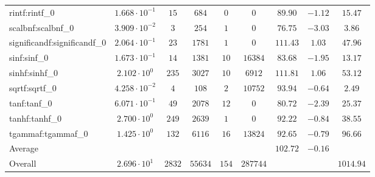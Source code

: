 \begin{tabular}{|l|c|c|c|c|c|c|c|c|}
rintf:rintf\_0               & $ 1.668 \cdot 10^{-1} $ & $ 15     $ & $ 684   $ & $ 0   $ & $ 0      $ & $ 89.90       $ & $ -1.12   $ & $ 15.47   $ \\
scalbnf:scalbnf\_0           & $ 3.909 \cdot 10^{-2} $ & $ 3      $ & $ 254   $ & $ 1   $ & $ 0      $ & $ 76.75       $ & $ -3.03   $ & $ 3.86    $ \\
significandf:significandf\_0 & $ 2.064 \cdot 10^{-1} $ & $ 23     $ & $ 1781  $ & $ 1   $ & $ 0      $ & $ 111.43      $ & $ 1.03    $ & $ 47.96   $ \\
sinf:sinf\_0                 & $ 1.673 \cdot 10^{-1} $ & $ 14     $ & $ 1381  $ & $ 10  $ & $ 16384  $ & $ 83.68       $ & $ -1.95   $ & $ 13.17   $ \\
sinhf:sinhf\_0               & $ 2.102 \cdot 10^{0}  $ & $ 235    $ & $ 3027  $ & $ 10  $ & $ 6912   $ & $ 111.81      $ & $ 1.06    $ & $ 53.12   $ \\
sqrtf:sqrtf\_0               & $ 4.258 \cdot 10^{-2} $ & $ 4      $ & $ 108   $ & $ 2   $ & $ 10752  $ & $ 93.94       $ & $ -0.64   $ & $ 2.49    $ \\
tanf:tanf\_0                 & $ 6.071 \cdot 10^{-1} $ & $ 49     $ & $ 2078  $ & $ 12  $ & $ 0      $ & $ 80.72       $ & $ -2.39   $ & $ 25.37   $ \\
tanhf:tanhf\_0               & $ 2.700 \cdot 10^{0}  $ & $ 249    $ & $ 2639  $ & $ 1   $ & $ 0      $ & $ 92.22       $ & $ -0.84   $ & $ 38.55   $ \\
tgammaf:tgammaf\_0           & $ 1.425 \cdot 10^{0}  $ & $ 132    $ & $ 6116  $ & $ 16  $ & $ 13824  $ & $ 92.65       $ & $ -0.79   $ & $ 96.66   $ \\
\hline
Average                      & $                     $ & $        $ & $       $ & $     $ & $        $ & $ 102.72      $ & $ -0.16   $ & $         $ \\
\hline
Overall                      & $ 2.696 \cdot 10^{1}  $ & $ 2832   $ & $ 55634 $ & $ 154 $ & $ 287744 $ & $             $ & $         $ & $ 1014.94 $ \\
\hline
\end{tabular}
